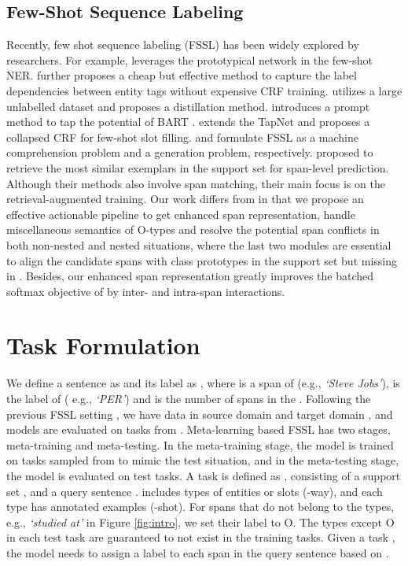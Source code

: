\documentclass[11pt]{article}
\begin{document}
\subsection{Few-Shot Sequence Labeling}
Recently, few shot sequence labeling (FSSL) has been widely explored by researchers.
For example, \cite{fritzler2019few} leverages the prototypical network \cite{Proto} in the few-shot NER.
\cite{NNshot} further proposes a cheap but effective method to capture the label dependencies between entity tags without expensive CRF training.
\cite{wang2021meta} utilizes a large unlabelled dataset and proposes a distillation method.
\cite{cui-etal-2021-template} introduces a prompt method to tap the potential of BART \cite{lewis2020bart}.
\cite{fewshothou} extends the TapNet \cite{yoon2019tapnet} and proposes a collapsed CRF for few-shot slot filling.
\cite{mrc-few-slot} and \cite{GSL} formulate FSSL as a machine comprehension problem and a generation problem, respectively.
\cite{span-naacl} proposed to retrieve the most similar exemplars in the support set for span-level prediction. 
Although their methods also involve span matching, their main focus is on the retrieval-augmented training. 
Our work differs from \cite{span-naacl} in that we propose an effective actionable pipeline to get enhanced span representation, handle miscellaneous semantics of O-types and resolve the potential span conflicts in both non-nested and nested situations, where the last two modules are essential to align the candidate spans with class prototypes in the support set but missing in \cite{span-naacl}.
Besides, our enhanced span representation greatly improves the batched softmax objective of \cite{span-naacl} by inter- and intra-span interactions. 
 
\section{Task Formulation}
We define a sentence as  and its label as , where  is a span of  (e.g., \textit{`Steve Jobs’}),  is the label of  ( e.g., \textit{`PER'}) and  is the number of spans in the .
Following the previous FSSL setting \cite{fewshothou, FewNERD}, we have data in source domain  and target domain , and models are evaluated on tasks from .
Meta-learning based FSSL has two stages, meta-training and meta-testing. 
In the meta-training stage, the model is trained on tasks sampled from  to mimic the test situation, and in the meta-testing stage, the model is evaluated on test tasks.
A task is defined as , consisting of a support set ,  and a query sentence . 
 includes  types of entities or slots (-way), and each type has  annotated examples (-shot). 
For spans that do not belong to the  types, e.g., \textit{`studied at'} in Figure \ref{fig:intro}, we set their label to O.
The types except O in each test task are guaranteed to not exist in the training tasks.
Given a task ,  the model needs to assign a label to each span in the query sentence  based on .
\end{document}
